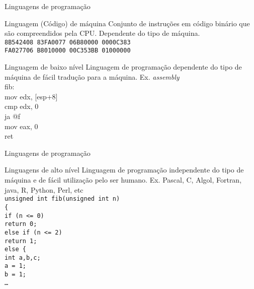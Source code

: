 \documentclass[handout]{beamer}
\begin{document}
\begin{frame}{Linguagens de programação}
  \begin{block}{Linguagem (Código) de máquina}
     Conjunto de instruções em código binário que são compreendidos pela CPU. Dependente do tipo de máquina.\\
\texttt{8B542408 83FA0077 06B80000 0000C383\\
FA027706 B8010000 00C353BB 01000000}
  \end{block}
\pause
  \begin{block}{Linguagem de baixo nível}
        Linguagem de programação  dependente do tipo de máquina de fácil tradução para a máquina. Ex. \textit{assembly}\\
fib: \\
\hspace{30pt}    mov edx, [esp+8]\\
\hspace{30pt}    cmp edx, 0\\
\hspace{30pt}    ja @f\\
\hspace{30pt}    mov eax, 0\\
\hspace{30pt}    ret\\    
  \end{block}
  \end{frame}

  \begin{frame}{Linguagens de programação}
    \begin{block}{Linguagens de alto nível}
         Linguagem de programação independente do tipo de máquina e de fácil utilização pelo ser humano. Ex. Pascal, C, Algol, Fortran, java, R, Python, Perl, etc\\
 \texttt{unsigned int fib(unsigned int n)\\
 \{\\
\hspace{10pt}    if (n <= 0)\\
\hspace{10pt}\hspace{10pt}        return 0;\\
\hspace{10pt}    else if (n <= 2)\\
\hspace{10pt}\hspace{10pt}        return 1;\\
\hspace{10pt}    else \{\\
\hspace{10pt}\hspace{10pt}        int a,b,c;\\
\hspace{10pt}\hspace{10pt}        a = 1;\\
\hspace{10pt}\hspace{10pt}        b = 1;\\
\ldots\\
  } 
    \end{block}
  \end{frame}
\end{document}
